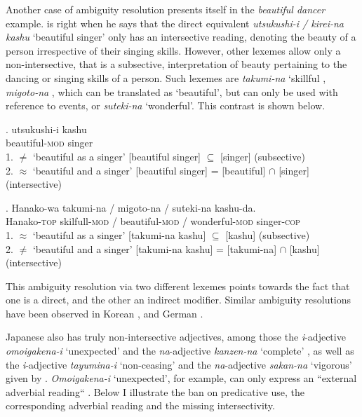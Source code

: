 \documentclass [output=book,colorlinks,citecolor=brown]{langscibook}
\begin{document}
Another case of ambiguity resolution presents itself in the \textit{beautiful dancer} example. \citet[3]{baker:2003:verbal} is right when he says that the direct equivalent \textit{utsukushi-i / kirei-na kashu} `beautiful singer’ only has an intersective reading, denoting the beauty of a person irrespective of their singing skills. However, other lexemes allow only a non-intersective, that is a subsective, interpretation of beauty pertaining to the dancing or singing skills of a person. Such lexemes are \textit{takumi-na} `skillful \citep[101, Fn. 2]{ayano:2010:revisiting}, \textit{migoto-na} \citep[786]{watanabe:2017:attributive}, which can be translated as `beautiful’, but can only be used with reference to events, or \textit{suteki-na} `wonderful'. This contrast is shown below. %

\exg. utsukushi-i kashu\\
beautiful-\textsc{mod} singer \null \hfill \citep[3]{baker:2003:verbal}\\
1. $\neq$ `beautiful as a singer’ [beautiful singer] $\subseteq$ [singer] (subsective)\\
2. $\approx$ `beautiful and a singer’ [beautiful singer] = [beautiful] $\cap$ [singer] (intersective)

\exg. Hanako-wa takumi-na / migoto-na / suteki-na kashu-da.\\
Hanako-\textsc{top} skilfull-\textsc{mod} / beautiful-\textsc{mod} / wonderful-\textsc{mod} singer-\textsc{cop}\\
1. $\approx$ `beautiful as a singer’ [takumi-na kashu] $\subseteq$ [kashu] (subsective)\\
2. $\neq$ `beautiful and a singer’ [takumi-na kashu] = [takumi-na] $\cap$ [kashu] (intersective)

This ambiguity resolution via two different lexemes points towards the fact that one is a direct, and the other an indirect modifier. Similar ambiguity resolutions have been observed in Korean \citep[161]{kang:2005:adj}, and German \citep[69]{maienborn:2020:revisiting}. %

Japanese also has truly non-intersective adjectives, among those the \textit{i}-adjective \textit{omoigakena-i} `unexpected' and the \textit{na}-adjective \textit{kanzen-na} `complete' \citep[67–68]{yamakido:2005:nature}, as well as the \textit{i}-adjective \textit{tayumina-i} `non-ceasing' and the \textit{na}-adjective \textit{sakan-na} `vigorous' given by \citet{ayano:2010:revisiting}. \textit{Omoigakena-i} `unexpected', for example, can only express an ``external adverbial reading“ \citep[64]{yamakido:2005:nature}. Below I illustrate the ban on predicative use, the corresponding adverbial reading and the missing intersectivity. %
\end{document}
